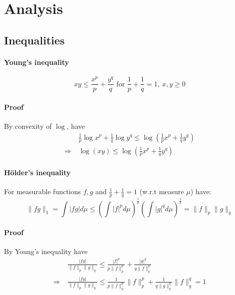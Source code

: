 \documentclass{scrartcl}
\begin{document}
\section{Analysis}

\subsection{Inequalities}

\paragraph{Young's inequality}
\begin{equation}
    xy \leq \frac {x^p} p + \frac {y^q} q \text{ for } \frac 1 p + \frac 1 q = 1, \ x, y \geq 0 \nonumber
\end{equation}
\paragraph{Proof} By convexity of $\log$, have
\begin{equation}
    \begin{split}
        &\frac 1 p \log x^p + \frac 1 q \log y^q \leq \log \left( \frac 1 p x^p + \frac 1 q y^q \right) \\
        \Rightarrow \ &\log ( x y ) \leq \log \left( \frac 1 p x^p + \frac 1 q y^q \right) \nonumber
    \end{split}
\end{equation}

\paragraph{Hölder's inequality} For measurable functions $f, g$ and $\frac 1 p + \frac 1 q = 1$ (w.r.t measure $\mu$) have:
\label{hoelder_inequality}
\begin{equation}
    \| fg \|_1 = \int | fg | d\mu \leq \left( \int |f|^p d\mu \right)^{\frac 1 p} \left( \int |g|^q d\mu \right)^{\frac 1 q} = \|f\|_p \|g\|_q \nonumber
\end{equation}
\paragraph{Proof} By Young's inequality have
\begin{equation}
    \begin{split}
        &\frac {|fg|} {\| f \|_p \| g \|_q} \leq \frac {|f|^p} {p\|f\|_p^p} + \frac {|g|^q} {q\|f\|_q^q} \\
        \Rightarrow \ &\frac {|fg|} {\| f \|_p \| g \|_q} \leq \frac 1 {p \|f\|_p^p} \|f\|_p^p + \frac 1 {q \|g\|_q^q} \|f\|_q^q = 1 \nonumber
    \end{split}
\end{equation}
\end{document}
